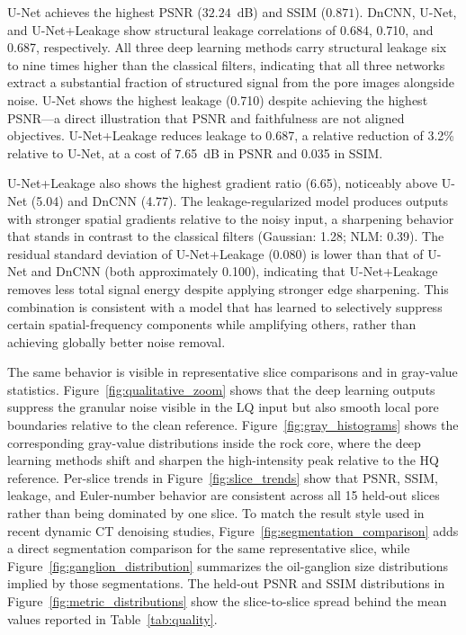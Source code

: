 \documentclass[review,12pt]{elsarticle}
\begin{document}
U-Net achieves the highest PSNR ($32.24$~dB) and SSIM ($0.871$).
DnCNN, U-Net, and U-Net+Leakage show structural leakage correlations of
0.684, 0.710, and 0.687, respectively.  All three deep learning methods
carry structural leakage six to nine times higher than the classical
filters, indicating that all three networks extract a substantial
fraction of structured signal from the pore images alongside noise.
U-Net shows the highest leakage (0.710) despite achieving the highest
PSNR---a direct illustration that PSNR and faithfulness are not aligned
objectives.  U-Net+Leakage reduces leakage to 0.687, a relative
reduction of 3.2\% relative to U-Net, at a cost of 7.65~dB in PSNR and
0.035 in SSIM.

U-Net+Leakage also shows the highest gradient ratio (6.65), noticeably
above U-Net (5.04) and DnCNN (4.77).  The leakage-regularized
model produces outputs with stronger spatial gradients relative to the
noisy input, a sharpening behavior that stands in contrast to the
classical filters (Gaussian: 1.28; NLM: 0.39).  The residual standard
deviation of U-Net+Leakage (0.080) is lower than that of U-Net and
DnCNN (both approximately 0.100), indicating that U-Net+Leakage removes
less total signal energy despite applying stronger edge sharpening.
This combination is consistent with a model that has learned to
selectively suppress certain spatial-frequency components while
amplifying others, rather than achieving globally better noise removal.

The same behavior is visible in representative slice comparisons and in
gray-value statistics.  Figure~\ref{fig:qualitative_zoom} shows that the
deep learning outputs suppress the granular noise visible in the LQ
input but also smooth local pore boundaries relative to the clean
reference.  Figure~\ref{fig:gray_histograms} shows the corresponding
gray-value distributions inside the rock core, where the deep learning
methods shift and sharpen the high-intensity peak relative to the HQ
reference.  Per-slice trends in Figure~\ref{fig:slice_trends} show that
PSNR, SSIM, leakage, and Euler-number behavior are consistent across
all 15 held-out slices rather than being dominated by one slice.
To match the result style used in recent dynamic CT denoising studies,
Figure~\ref{fig:segmentation_comparison} adds a direct segmentation
comparison for the same representative slice, while
Figure~\ref{fig:ganglion_distribution} summarizes the oil-ganglion size
distributions implied by those segmentations.  The held-out PSNR and
SSIM distributions in Figure~\ref{fig:metric_distributions} show the
slice-to-slice spread behind the mean values reported in
Table~\ref{tab:quality}.
\end{document}
